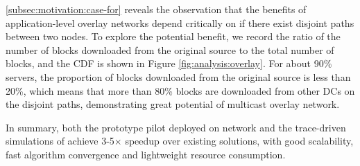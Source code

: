  \Section\ref{subsec:motivation:case-for} reveals the observation that the benefits of application-level overlay networks depend critically on if there exist disjoint paths between two nodes. To explore the potential benefit, we record the ratio of the number of blocks downloaded from the original source to the total number of blocks, and the CDF is shown in Figure \ref{fig:analysis:overlay}. For about 90\% servers, the proportion of blocks downloaded from the original source is less than 20\%, which means that more than 80\% blocks are downloaded from other DCs on the disjoint paths, demonstrating great potential of multicast overlay network.

In summary, both the prototype pilot deployed on \company network and the trace-driven simulations of \name achieve 3-5$\times$ speedup over existing solutions, with good scalability, fast algorithm convergence and lightweight resource consumption.

%
%
%





